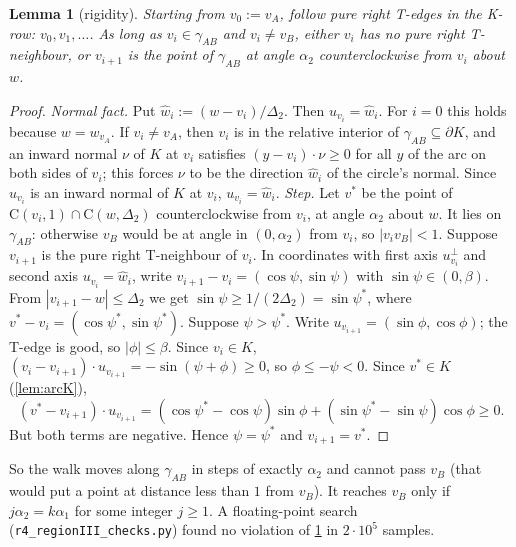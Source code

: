 \documentclass[11pt]{amsart}
\newtheorem{lemma}[theorem]{Lemma}
\theoremstyle{definition}
\theoremstyle{remark}
\newcommand{\Dt}{\Delta_2}
\newcommand{\Cc}{\mathrm{C}}      %
\begin{document}
\begin{lemma}[rigidity]\label{lem:rigid}
Starting from $v_0:=v_A$, follow pure right T-edges in the K-row: $v_0,v_1,\dots$. As long as $v_i\in\gamma_{AB}$ and $v_i\ne v_B$, either $v_i$ has no pure right T-neighbour, or $v_{i+1}$ is the point of $\gamma_{AB}$ at angle $\alpha_2$ counterclockwise from $v_i$ about $w$.
\end{lemma}
\begin{proof}
\emph{Normal fact.} Put $\hat w_i:=(w-v_i)/\Dt$. Then $u_{v_i}=\hat w_i$. For $i=0$ this holds because $w=w_{v_A}$. If $v_i\ne v_A$, then $v_i$ is in the relative interior of $\gamma_{AB}\subseteq\partial K$, and an inward normal $\nu$ of $K$ at $v_i$ satisfies $(y-v_i)\cdot\nu\ge0$ for all $y$ of the arc on both sides of $v_i$; this forces $\nu$ to be the direction $\hat w_i$ of the circle's normal. Since $u_{v_i}$ is an inward normal of $K$ at $v_i$, $u_{v_i}=\hat w_i$.
\emph{Step.} Let $v^*$ be the point of $\Cc(v_i,1)\cap\Cc(w,\Dt)$ counterclockwise from $v_i$, at angle $\alpha_2$ about $w$. It lies on $\gamma_{AB}$: otherwise $v_B$ would be at angle in $(0,\alpha_2)$ from $v_i$, so $|v_iv_B|<1$. Suppose $v_{i+1}$ is the pure right T-neighbour of $v_i$. In coordinates with first axis $u_{v_i}^\perp$ and second axis $u_{v_i}=\hat w_i$, write $v_{i+1}-v_i=(\cos\psi,\sin\psi)$ with $\sin\psi\in(0,\beta)$. From $|v_{i+1}-w|\le\Dt$ we get $\sin\psi\ge1/(2\Dt)=\sin\psi^*$, where $v^*-v_i=(\cos\psi^*,\sin\psi^*)$. Suppose $\psi>\psi^*$. Write $u_{v_{i+1}}=(\sin\phi,\cos\phi)$; the T-edge is good, so $|\phi|\le\beta$. Since $v_i\in K$, $(v_i-v_{i+1})\cdot u_{v_{i+1}}=-\sin(\psi+\phi)\ge0$, so $\phi\le-\psi<0$. Since $v^*\in K$ (\cref{lem:arcK}),
\[
(v^*-v_{i+1})\cdot u_{v_{i+1}}=(\cos\psi^*-\cos\psi)\sin\phi+(\sin\psi^*-\sin\psi)\cos\phi\ge0 .
\]
But both terms are negative. Hence $\psi=\psi^*$ and $v_{i+1}=v^*$.
\end{proof}

So the walk moves along $\gamma_{AB}$ in steps of exactly $\alpha_2$ and cannot pass $v_B$ (that would put a point at distance less than $1$ from $v_B$). It reaches $v_B$ only if $j\alpha_2=k\alpha_1$ for some integer $j\ge1$. A floating-point search (\texttt{r4\_regionIII\_checks.py}) found no violation of \cref{lem:rigid} in $2\cdot10^5$ samples.
\end{document}
